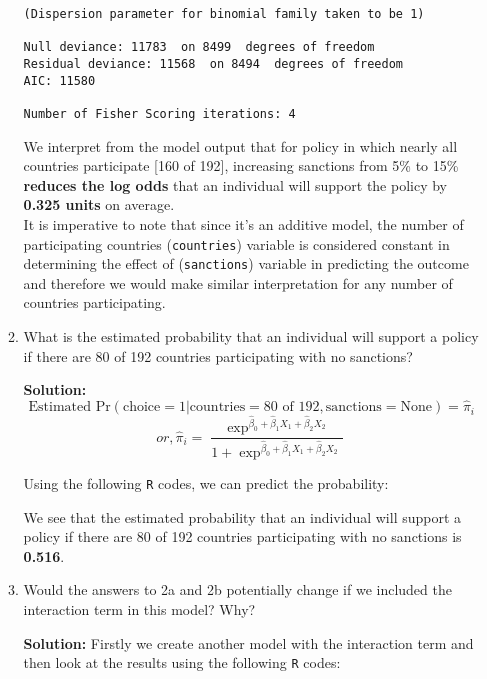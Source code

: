 \documentclass[12pt,letterpaper]{article}
\begin{document}
\begin{enumerate}
\begin{enumerate}
\begin{Verbatim}
(Dispersion parameter for binomial family taken to be 1)

Null deviance: 11783  on 8499  degrees of freedom
Residual deviance: 11568  on 8494  degrees of freedom
AIC: 11580

Number of Fisher Scoring iterations: 4
\end{Verbatim}

We interpret from the model output that for policy in which nearly all countries participate [160 of 192], increasing sanctions from 5\% to 15\% \textbf{reduces the log odds} that an individual will support the policy by \textbf{0.325 units} on average.\\
It is imperative to note that since it's an additive model, the number of participating countries (\texttt{countries}) variable is considered constant in determining the effect of (\texttt{sanctions}) variable in predicting the outcome and therefore we would make similar interpretation for any number of countries participating.

\pagebreak
		\item
		What is the estimated probability that an individual will support a policy if there are 80 of 192 countries participating with no sanctions? 

\vspace*{.2cm}
\noindent\textbf{Solution:}
\[\text{Estimated Pr}(\text{choice}=1|\text{countries}=80 \text{ of 192}, \text{sanctions}=\text{None}) = \hat{\pi}_i\]
\[or, \hat{\pi}_i = \frac{\exp^{\hat{\beta}_0 + \hat{\beta}_1 X_1 + \hat{\beta}_2 X_2}}{1 + \exp^{\hat{\beta}_0 + \hat{\beta}_1 X_1 + \hat{\beta}_2 X_2}}\]

Using the following \texttt{R} codes, we can predict the probability:


We see that the estimated probability that an individual will support a policy if there are 80 of 192 countries participating with no sanctions is \textbf{0.516}.		
		
		\item
		Would the answers to 2a and 2b potentially change if we included the interaction term in this model? Why? 
		
		
		\vspace*{.2cm}
		\noindent\textbf{Solution:}
		Firstly we create another model with the interaction term and then look at the results using the following \texttt{R} codes:
		


\end{enumerate}
\end{enumerate}
\end{document}
